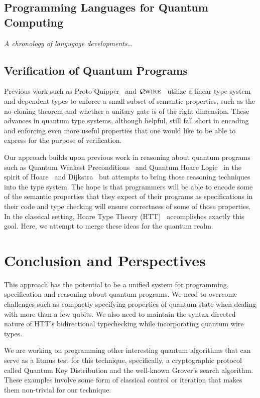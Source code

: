 \documentclass[acmsmall,nonacm,timestamp,review]{acmart}
\newcommand{\qwire}{\ensuremath{\mathcal{Q}\textsc{wire}}\xspace}
\begin{document}
\subsection{Programming Languages for Quantum Computing}
\textit{A chronology of langugage developments\ldots}

\subsection{Verification of Quantum Programs}
Previous work such as Proto-Quipper~\cite{ross_algebraic_2015,mahmoud_formalization_2019,rios_categorical_2017} and \qwire~\cite{paykin_qwire:_2017,rand_qwire_2017,rand_formally_2018} utilize a linear type system and dependent types to enforce a small subset of semantic properties, such as the no-cloning theorem and whether a unitary gate is of the right dimension. These advances in quantum type systems, although helpful, still fall short in encoding and enforcing even more useful properties that one would like to be able to express for the purpose of verification.

Our approach builds upon previous work in reasoning about quantum programs such as Quantum Weakest Preconditions~\cite{dhondt_quantum_2006} and Quantum Hoare Logic~\cite{ying_floydhoare_2012} in the spirit of Hoare~\cite{hoare_axiomatic_1969} and Dijkstra~\cite{dijkstra_discipline_1976} but attempts to bring those reasoning techniques into the type system. The hope is that programmers will be able to encode some of the semantic properties that they expect of their programs as specifications in their code and type checking will ensure correctness of some of those properties. In the classical setting, Hoare Type Theory (HTT)~\cite{nanevski_hoare_2008} accomplishes exactly this goal. Here, we attempt to merge these ideas for the quantum realm.

\section{Conclusion and Perspectives}
This approach has the potential to be a unified system for programming, specification and reasoning about quantum programs. We need to overcome challenges such as compactly specifying properties of quantum state when dealing with more than a few qubits. We also need to maintain the syntax directed nature of HTT's bidirectional typechecking while incorporating quantum wire types.

We are working on programming other interesting quantum algorithms that can serve as a litmus test for this technique, specifically, a cryptographic protocol called Quantum Key Distribution and the well-known Grover's search algorithm. These examples involve some form of classical control or iteration that makes them non-trivial for our technique.
\end{document}
